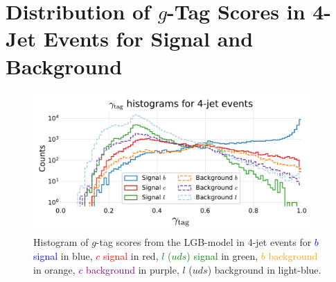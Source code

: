 \section[Distribution of g-Tag Scores in 4-Jet Events for Signal and Background]{Distribution of $g$-Tag Scores in 4-Jet Events for Signal and Background}
\begin{figure}[h!]
    \includegraphics[width=0.95\textwidth, trim=10 10 10 45, clip]{figures/quarks/gtag-histogram-sigbkg-down_sample=1.00-ML_vars=vertex-selection=b-ejet_min=4-n_iter_RS_lgb=99-n_iter_RS_xgb=9-cdot_cut=0.90-version=19-njet=4.pdf}
    \caption[Distribution of $g$-Tag Scores in 4-Jet Events for Signal and Background]
            {Histogram of $g$-tag scores from the LGB-model in 4-jet events for \textcolor{blue}{$b$ signal} in blue, \textcolor{red}{$c$ signal} in red, \textcolor{green}{$l$ ($uds$) signal} in green, \textcolor{orange}{$b$ background} in orange, \textcolor{purple}{$c$ background} in purple, \textcolor{light-blue}{$l$ ($uds$) background} in light-blue.   } 
\end{figure}
\vspace{2cm}
